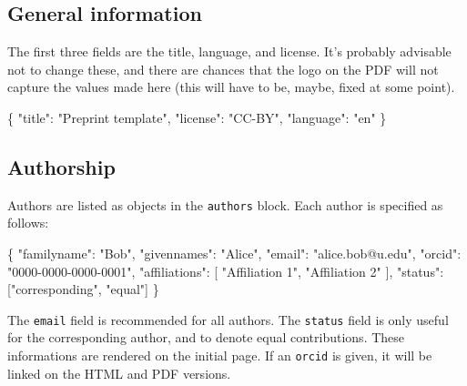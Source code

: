 \documentclass[11pt]{article}
\newenvironment{Shaded}{\begin{snugshade}}{\end{snugshade}}
\newcommand{\DataTypeTok}[1]{\textcolor[rgb]{0.13,0.29,0.53}{#1}}
\newcommand{\StringTok}[1]{\textcolor[rgb]{0.31,0.60,0.02}{#1}}
\newcommand{\OtherTok}[1]{\textcolor[rgb]{0.56,0.35,0.01}{#1}}
\newcommand{\FunctionTok}[1]{\textcolor[rgb]{0.00,0.00,0.00}{#1}}
\begin{document}
\hypertarget{general-information}{%
\subsection{General information}\label{general-information}}

The first three fields are the title, language, and license. It's
probably advisable not to change these, and there are chances that the
logo on the PDF will not capture the values made here (this will have to
be, maybe, fixed at some point).

\begin{Shaded}
\begin{Highlighting}[]
\FunctionTok{\{}
    \DataTypeTok{"title"}\FunctionTok{:} \StringTok{"Preprint template"}\FunctionTok{,}
    \DataTypeTok{"license"}\FunctionTok{:} \StringTok{"CC{-}BY"}\FunctionTok{,}
    \DataTypeTok{"language"}\FunctionTok{:} \StringTok{"en"}
\FunctionTok{\}}
\end{Highlighting}
\end{Shaded}

\hypertarget{authorship}{%
\subsection{Authorship}\label{authorship}}

Authors are listed as objects in the \texttt{authors} block. Each author
is specified as follows:

\begin{Shaded}
\begin{Highlighting}[]
\FunctionTok{\{}
      \DataTypeTok{"familyname"}\FunctionTok{:} \StringTok{"Bob"}\FunctionTok{,}
      \DataTypeTok{"givennames"}\FunctionTok{:} \StringTok{"Alice"}\FunctionTok{,}
      \DataTypeTok{"email"}\FunctionTok{:} \StringTok{"alice.bob@u.edu"}\FunctionTok{,}
      \DataTypeTok{"orcid"}\FunctionTok{:} \StringTok{"0000{-}0000{-}0000{-}0001"}\FunctionTok{,}
      \DataTypeTok{"affiliations"}\FunctionTok{:} \OtherTok{[}
        \StringTok{"Affiliation 1"}\OtherTok{,}
        \StringTok{"Affiliation 2"}
      \OtherTok{]}\FunctionTok{,}
      \DataTypeTok{"status"}\FunctionTok{:} \OtherTok{[}\StringTok{"corresponding"}\OtherTok{,} \StringTok{"equal"}\OtherTok{]}
    \FunctionTok{\}}
\end{Highlighting}
\end{Shaded}

The \texttt{email} field is recommended for all authors. The
\texttt{status} field is only useful for the corresponding author, and
to denote equal contributions. These informations are rendered on the
initial page. If an \texttt{orcid} is given, it will be linked on the
HTML and PDF versions.
\end{document}
